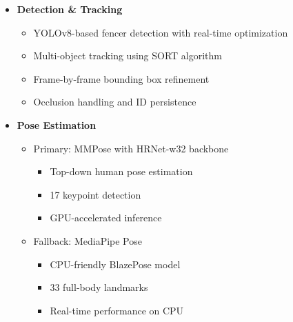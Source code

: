 \documentclass[landscape]{article}
\begin{document}
\begin{itemize}
    \item \textbf{Detection \& Tracking}
    \begin{itemize}
        \item YOLOv8-based fencer detection with real-time optimization
        \item Multi-object tracking using SORT algorithm
        \item Frame-by-frame bounding box refinement
        \item Occlusion handling and ID persistence
    \end{itemize}
    
    \item \textbf{Pose Estimation}
    \begin{itemize}
        \item Primary: MMPose with HRNet-w32 backbone
        \begin{itemize}
            \item Top-down human pose estimation
            \item 17 keypoint detection
            \item GPU-accelerated inference
        \end{itemize}
        \item Fallback: MediaPipe Pose
        \begin{itemize}
            \item CPU-friendly BlazePose model
            \item 33 full-body landmarks
            \item Real-time performance on CPU
        \end{itemize}
    \end{itemize}
    

\end{itemize}
\end{document}
